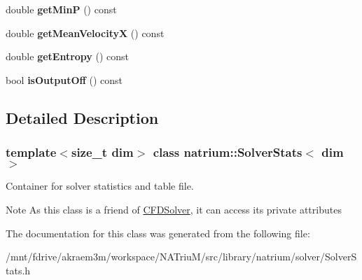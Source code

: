 \begin{DoxyCompactItemize}
\item 
\hypertarget{classnatrium_1_1SolverStats_a582de4d3fd470f78c03cada1c8ebf959}{
double {\bfseries getMinP} () const }
\label{classnatrium_1_1SolverStats_a582de4d3fd470f78c03cada1c8ebf959}

\item 
\hypertarget{classnatrium_1_1SolverStats_a331dab963d64362612b3378fc9588894}{
double {\bfseries getMeanVelocityX} () const }
\label{classnatrium_1_1SolverStats_a331dab963d64362612b3378fc9588894}

\item 
\hypertarget{classnatrium_1_1SolverStats_a784dddde05eaaa83786abf861cc141ae}{
double {\bfseries getEntropy} () const }
\label{classnatrium_1_1SolverStats_a784dddde05eaaa83786abf861cc141ae}

\item 
\hypertarget{classnatrium_1_1SolverStats_a8ddba40cb3701c77b60884d48679db95}{
bool {\bfseries isOutputOff} () const }
\label{classnatrium_1_1SolverStats_a8ddba40cb3701c77b60884d48679db95}

\end{DoxyCompactItemize}


\subsection{Detailed Description}
\subsubsection*{template$<$size\_\-t dim$>$ class natrium::SolverStats$<$ dim $>$}

Container for solver statistics and table file. \begin{DoxyNote}{Note}
As this class is a friend of \hyperlink{classnatrium_1_1CFDSolver}{CFDSolver}, it can access its private attributes 
\end{DoxyNote}


The documentation for this class was generated from the following file:\begin{DoxyCompactItemize}
\item 
/mnt/fdrive/akraem3m/workspace/NATriuM/src/library/natrium/solver/SolverStats.h\end{DoxyCompactItemize}
